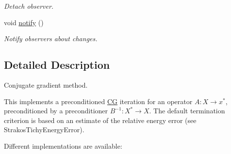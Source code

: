 \begin{DoxyCompactItemize}
\begin{DoxyCompactList}\small\item\em Detach observer. \end{DoxyCompactList}\item 
\hypertarget{classSpacy_1_1Mixin_1_1MixinConnection_a1ddeaa78a3bb4a38c2cca36d1f99fe36}{}void \hyperlink{classSpacy_1_1Mixin_1_1MixinConnection_a1ddeaa78a3bb4a38c2cca36d1f99fe36}{notify} ()\label{classSpacy_1_1Mixin_1_1MixinConnection_a1ddeaa78a3bb4a38c2cca36d1f99fe36}

\begin{DoxyCompactList}\small\item\em Notify observers about changes. \end{DoxyCompactList}\end{DoxyCompactItemize}


\subsection{Detailed Description}
Conjugate gradient method. 

This implements a preconditioned \hyperlink{namespaceSpacy_1_1CG}{C\+G} iteration for an operator $ A: X\to x^* $, preconditioned by a preconditioner $ B^{-1}: X^* \to X $. The default termination criterion is based on an estimate of the relative energy error (see Strakos\+Tichy\+Energy\+Error).

Different implementations are available\+:


